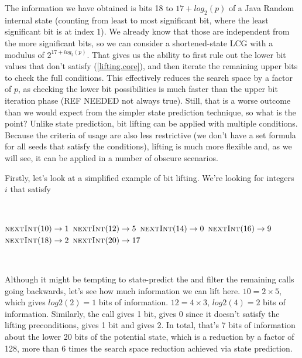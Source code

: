 \documentclass{article}
\begin{document}
The information we have obtained is bits 18 to $17 + log_2(p)$ of a Java Random internal state (counting from least to most significant bit, where the least significant bit is at index 1). We already know that those are independent from the more significant bits, so we can consider a shortened-state LCG with a modulus of $2^{17+log_2(p)}$. That gives us the ability to first rule out the lower bit values that don’t satisfy (\ref{lifting.core}), and then iterate the remaining upper bits to check the full conditions. This effectively reduces the search space by a factor of $p$, as checking the lower bit possibilities is much faster than the upper bit iteration phase (REF NEEDED not always true). Still, that is a worse outcome than we would expect from the simpler state prediction technique, so what is the point? Unlike state prediction, bit lifting can be applied with multiple conditions. Because the criteria of usage are also less restrictive (we don’t have a set formula for all seeds that satisfy the conditions), lifting is much more flexible and, as we will see, it can be applied in a number of obscure scenarios.

Firstly, let’s look at a simplified example of bit lifting. We’re looking for integers $i$ that satisfy

\
\begin{algorithmic}
\State {}
\State $\Call{nextInt}{10} \to 1$
\State $\Call{nextInt}{12} \to 5$
\State $\Call{nextInt}{14} \to 0$
\State $\Call{nextInt}{16} \to 9$
\State $\Call{nextInt}{18} \to 2$
\State $\Call{nextInt}{20} \to 17$
\end{algorithmic}
\ \

Although it might be tempting to state-predict the  and filter the remaining calls going backwards, let’s see how much information we can lift here. $10 = 2 \times 5$, which gives $log2(2) = 1$ bits of information. $12 = 4 \times 3$, $log2(4) = 2$ bits of information. Similarly, the  call gives 1 bit,  gives 0 since it doesn’t satisfy the lifting preconditions,  gives 1 bit and  gives 2. In total, that’s 7 bits of information about the lower 20 bits of the potential state, which is a reduction by a factor of 128, more than 6 times the search space reduction achieved via state prediction. %

\end{document}
